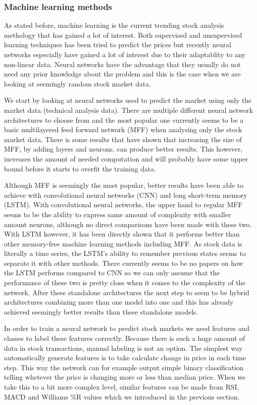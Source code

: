 \subsubsection{Machine learning methods}

As stated before, machine learning is the current trending stock analysis methology that has gained a lot of interest.
Both supervised and unsupervised learning techniques has been tried to predict the prices but recently neural networks especially have gained a lot of interest due to their adaptablity to any non-linear data.
Neural networks have the advantage that they usually do not need any prior knowledge about the problem and this is the case when we are looking at seemingly random stock market data.

We start by looking at neural networks used to predict the market using only the market data (technical analysis data).
There are multiple different neural network architectures to choose from and the most popular one currently seems to be a basic multilayered feed forward network (MFF) when analysing only the stock market data.
There is some results that have shown that increasing the size of MFF, by adding layers and neurons, can produce better results.
This however, increases the amount of needed computation and will probably have some upper bound before it starts to overfit the training data. \cite{senguptaa}

Although MFF is seemingly the most popular, better results have been able to achieve with convolutional neural networks (CNN) and long short-term memory (LSTM).
With convolutional neural networks, the upper hand to regular MFF seems to be the ability to express same amount of complexity with smaller amount neurons, although no direct comparisons have been made with these two.
With LSTM however, it has been directly shown that it performs better than other memory-free machine learning methods including MFF.
As stock data is literally a time series, the LSTM's ability to remember previous states seems to separate it with other methods.
There currently seems to be no papers on how the LSTM performs compared to CNN so we can only assume that the performance of these two is pretty close when it comes to the complexity of the network.
After these standalone architectures the next step to seem to be hybrid architectures combining more than one model into one and this has already achieved seemingly better results than these standalone models. \cite{senguptaa}

In order to train a neural network to predict stock markets we need features and classes to label these features correctly.
Because there is such a huge amount of data in stock transactions, manual labeling is not an option.
The simplest way automatically generate features is to take calculate change in price in each time step.
This way the network can for example output simple binary classification telling whetever the price is changing more or less than median price. \cite{fischer}
When we take this to a bit more complex level, similar features can be made from RSI, MACD and Williams \%R values which we introduced in the previous section. \cite{serez}

